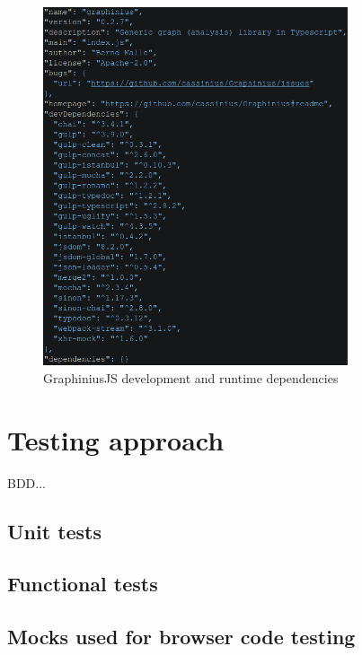 \begin{figure}[ht]
	\label{fig_dependencies}
	\centering
	\hspace*{-0.5cm}
	\includegraphics[width=0.8\textwidth]{figures/package_deps}
	\caption{GraphiniusJS development and runtime dependencies}
\end{figure}



\section{Testing approach}
\label{sect:testing_approach}

	BDD...
	
	\subsection{Unit tests}
	\label{ssect:unittests}
	
	\subsection{Functional tests}
	\label{ssect:func_tests}
	
	\subsection{Mocks used for browser code testing}
	\label{ssect:mocks}

